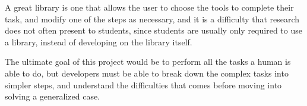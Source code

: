 \documentclass[12pt]{report}
\begin{document}
A great library is one that allows the user to choose the tools to complete their task, and modify one of the steps as necessary, and it is a difficulty that research does not often present to students, since students are usually only required to use a library, instead of developing on the library itself. 

The ultimate goal of this project would be to perform all the tasks a human is able to do, but developers must be able to break down the complex tasks into simpler steps, and understand the difficulties that comes before moving into solving a generalized case. 









\nocite{*}
\end{document}
